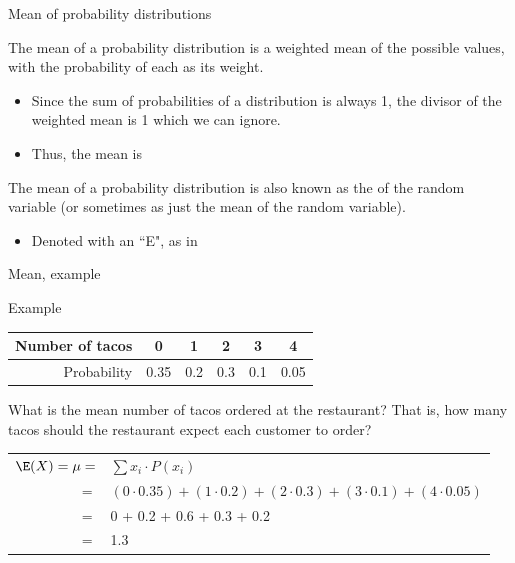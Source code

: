 \documentclass[xcolor=table, aspectratio=169, bigger, handout]{beamer}
\begin{document}
\begin{frame}{Mean of probability distributions}
\begin{block}{}
The mean of a probability distribution is a weighted mean of the possible values, with the probability of each as its weight. 

\begin{itemize}
\pause\item Since the sum of probabilities of a distribution is always 1, the divisor of the weighted mean is 1 which we can ignore.
\pause\item Thus, the mean is\\ \smallskip
{}
\end{itemize}
\medskip
\pause
The mean of a probability distribution is also known as the  of the random variable (or sometimes as just the mean of the random variable).
\begin{itemize}
\item Denoted with an ``E", as in \\ \smallskip
{}
\end{itemize}
\smallskip
\end{block}
\end{frame}

\begin{frame}{Mean, example}
\begin{exampleblock}{Example}
{\centering \tabspacemed
\begin{tabular}{r | c cccc}
Number of tacos & 0 & 1 & 2 & 3 & 4\\
\hline
Probability &  0.35 & 0.2 & 0.3 & 0.1 & 0.05
\end{tabular}\par
}
\bigskip

What is the mean number of tacos ordered at the restaurant? That is, how many tacos should the restaurant expect each customer to order?\\
\medskip
\pause
{\centering 
\begin{tabular}{r l}
$\E(X) = \mu =$ & $\sum x_i \cdot P(x_i)$\\
$=$ & $(0 \cdot 0.35) + (1 \cdot 0.2) + (2 \cdot 0.3) + (3 \cdot 0.1)+ (4 \cdot 0.05)$\\
$=$ & 0 + 0.2 + 0.6 + 0.3 + 0.2\\
$=$ & 1.3
\end{tabular}\par
\renewcommand{\arraystretch}{1.5}}

\end{exampleblock}
\end{frame}
\end{document}
